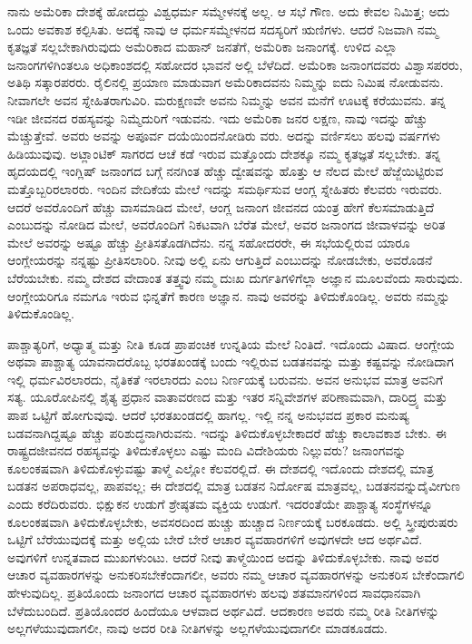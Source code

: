 ನಾನು ಅಮೆರಿಕಾ ದೇಶಕ್ಕೆ ಹೋದದ್ದು ವಿಶ್ವಧರ್ಮ ಸಮ್ಮೇಳನಕ್ಕೆ ಅಲ್ಲ. ಆ ಸಭೆ ಗೌಣ. ಅದು ಕೇವಲ ನಿಮಿತ್ತ; ಅದು ಒಂದು ಅವಕಾಶ ಕಲ್ಪಿಸಿತು. ಅದಕ್ಕೆ ನಾವು ಆ ಧರ್ಮಸಮ್ಮೇಳನದ ಸದಸ್ಯರಿಗೆ ಋಣಿಗಳು. ಆದರೆ ನಿಜವಾಗಿ ನಮ್ಮ ಕೃತಜ್ಞತೆ ಸಲ್ಲಬೇಕಾಗಿರುವುದು ಅಮೆರಿಕಾದ ಮಹಾನ್​ ಜನತೆಗೆ, ಅಮೆರಿಕಾ ಜನಾಂಗಕ್ಕೆ. ಉಳಿದ ಎಲ್ಲಾ ಜನಾಂಗಗಳಿಗಿಂತಲೂ ಅಧಿಕಾಂಶದಲ್ಲಿ ಸಹೋದರ ಭಾವನೆ ಅಲ್ಲಿ ಬೆಳೆದಿದೆ. ಅಮೆರಿಕಾ ಜನಾಂಗದವರು ವಿಶ್ವಾಸಪರರು, ಅತಿಥಿ ಸತ್ಕಾರಪರರು. ರೈಲಿನಲ್ಲಿ ಪ್ರಯಾಣ ಮಾಡುವಾಗ ಅಮೆರಿಕಾದವನು ನಿಮ್ಮನ್ನು ಐದು ನಿಮಿಷ ನೋಡುವನು. ನೀವಾಗಲೇ ಅವನ ಸ್ನೇಹಿತರಾಗುವಿರಿ. ಮರುಕ್ಷಣವೇ ಅವನು ನಿಮ್ಮನ್ನು ಅವನ ಮನೆಗೆ ಊಟಕ್ಕೆ ಕರೆಯುವನು. ತನ್ನ ಇಡೀ ಜೀವನದ ರಹಸ್ಯವನ್ನು ನಿಮ್ಮೆದುರಿಗೆ ಇಡುವನು. ಇದು ಅಮೆರಿಕಾ ಜನರ ಲಕ್ಷಣ, ನಾವು ಇದನ್ನು ಹೆಚ್ಚು ಮೆಚ್ಚುತ್ತೇವೆ. ಅವರು ಅವನ್ನು ಅಪೂರ್ವ ದಯೆಯಿಂದನೋಡಿರು ವರು. ಅದನ್ನು ವರ್ಣಿಸಲು ಹಲವು ವರ್ಷಗಳು ಹಿಡಿಯುವುವು. ಅಟ್ಲಾಂಟಿಕ್​ ಸಾಗರದ ಆಚೆ ಕಡೆ ಇರುವ ಮತ್ತೊಂದು ದೇಶಕ್ಕೂ ನಮ್ಮ ಕೃತಜ್ಞತೆ ಸಲ್ಲಬೇಕು. ತನ್ನ ಹೃದಯದಲ್ಲಿ ಇಂಗ್ಲಿಷ್​ ಜನಾಂಗದ ಬಗ್ಗೆ ನನಗಿಂತ ಹೆಚ್ಚು ದ್ವೇಷವನ್ನು ಹೊತ್ತು ಆ ನೆಲದ ಮೇಲೆ ಹೆಜ್ಜೆಯಿಟ್ಟಿರುವ ಮತ್ತೊಬ್ಬರಿರಲಾರರು. ಇಂದಿನ ವೇದಿಕೆಯ ಮೇಲೆ ಇದನ್ನು ಸಮರ್ಥಿಸುವ ಆಂಗ್ಲ ಸ್ನೇಹಿತರು ಕೆಲವರು ಇರುವರು. ಆದರೆ ಅವರೊಂದಿಗೆ ಹೆಚ್ಚು ವಾಸಮಾಡಿದ ಮೇಲೆ, ಆಂಗ್ಲ ಜನಾಂಗ ಜೀವನದ ಯಂತ್ರ ಹೇಗೆ ಕೆಲಸಮಾಡುತ್ತಿದೆ ಎಂಬುದನ್ನು ನೋಡಿದ ಮೇಲೆ, ಅವರೊಂದಿಗೆ ನಿಕಟವಾಗಿ ಬೆರೆತ ಮೇಲೆ, ಅವರ ಜನಾಂಗದ ಜೀವಾಳವನ್ನು ಅರಿತ ಮೇಲೆ ಅವರನ್ನು ಅಷ್ಟೂ ಹೆಚ್ಚು ಪ್ರೀತಿಸತೊಡಗಿದೆನು. ನನ್ನ ಸಹೋದರರೇ, ಈ ಸಭೆಯಲ್ಲಿರುವ ಯಾರೂ ಆಂಗ್ಲೇಯರನ್ನು ನನ್ನಷ್ಟು ಪ್ರೀತಿಸಲಾರಿರಿ. ನೀವು ಅಲ್ಲಿ ಏನು ಆಗುತ್ತಿದೆ ಎಂಬುದನ್ನು ನೋಡಬೇಕು, ಅವರೊಡನೆ ಬೆರೆಯಬೇಕು. ನಮ್ಮ ದೇಶದ ವೇದಾಂತ ತತ್ತ್ವವು ನಮ್ಮ ದುಃಖ ದುರ್ಗತಿಗಳಿಗೆಲ್ಲಾ ಅಜ್ಞಾನ ಮೂಲವೆಂದು ಸಾರುವುದು. ಆಂಗ್ಲೇಯರಿಗೂ ನಮಗೂ ಇರುವ ಭಿನ್ನತೆಗೆ ಕಾರಣ ಅಜ್ಞಾನ. ನಾವು ಅವರನ್ನು ತಿಳಿದುಕೊಂಡಿಲ್ಲ. ಅವರು ನಮ್ಮನ್ನು ತಿಳಿದುಕೊಂಡಿಲ್ಲ. 

ಪಾಶ್ಚಾತ್ಯರಿಗೆ, ಅಧ್ಯಾತ್ಮ ಮತ್ತು ನೀತಿ ಕೂಡ ಪ್ರಾಪಂಚಿಕ ಉನ್ನತಿಯ ಮೇಲೆ ನಿಂತಿದೆ. ಇದೊಂದು ವಿಷಾದ. ಆಂಗ್ಲೇಯ ಅಥವಾ ಪಾಶ್ಚಾತ್ಯ ಯಾವನಾದರೊಬ್ಬ ಭರತಖಂಡಕ್ಕೆ ಬಂದು ಇಲ್ಲಿರುವ ಬಡತನವನ್ನು ಮತ್ತು ಕಷ್ಟವನ್ನು ನೋಡಿದಾಗ ಇಲ್ಲಿ ಧರ್ಮವಿರಲಾರದು, ನೈತಿಕತೆ ಇರಲಾರದು ಎಂಬ ನಿರ್ಣಯಕ್ಕೆ ಬರುವನು. ಅವನ ಅನುಭವ ಮಾತ್ರ ಅವನಿಗೆ ಸತ್ಯ. ಯೂರೋಪಿನಲ್ಲಿ ಶೈತ್ಯ ಪ್ರಧಾನ ವಾತಾವರಣದ ಮತ್ತು ಇತರ ಸನ್ನಿವೇಶಗಳ ಪರಿಣಾಮವಾಗಿ, ದಾರಿದ್ರ್ಯ ಮತ್ತು ಪಾಪ ಒಟ್ಟಿಗೆ ಹೋಗುವುವು. ಆದರೆ ಭರತಖಂಡದಲ್ಲಿ ಹಾಗಲ್ಲ. ಇಲ್ಲಿ ನನ್ನ ಅನುಭವದ ಪ್ರಕಾರ ಮನುಷ್ಯ ಬಡವನಾಗಿದ್ದಷ್ಟೂ ಹೆಚ್ಚು ಪರಿಶುದ್ಧನಾಗಿರುವನು. ಇದನ್ನು ತಿಳಿದುಕೊಳ್ಳಬೇಕಾದರೆ ಹೆಚ್ಚು ಕಾಲಾವಕಾಶ ಬೇಕು. ಈ ರಾಷ್ಟ್ರದಜೀವನದ ರಹಸ್ಯವನ್ನು ತಿಳಿದುಕೊಳ್ಳಲು ಎಷ್ಟು ಮಂದಿ ವಿದೇಶಿಯರು ನಿಲ್ಲುವರು? ಜನಾಂಗವನ್ನು ಕೂಲಂಕಷವಾಗಿ ತಿಳಿದುಕೊಳ್ಳುವಷ್ಟು ತಾಳ್ಮೆ ಎಲ್ಲೋ ಕೆಲವರಲ್ಲಿದೆ. ಈ ದೇಶದಲ್ಲಿ ಇದೊಂದು ದೇಶದಲ್ಲಿ ಮಾತ್ರ ಬಡತನ ಅಪರಾಧವಲ್ಲ, ಪಾಪವಲ್ಲ; ಈ ದೇಶದಲ್ಲಿ ಮಾತ್ರ ಬಡತನ ನಿರ್ದೋಷ ಮಾತ್ರವಲ್ಲ, ಬಡತನವನ್ನುದೈವೀಗುಣ ಎಂದು ಕರೆದಿರುವರು. ಭಿಕ್ಷುಕನ ಉಡುಗೆ ಶ್ರೇಷ್ಠತಮ ವ್ಯಕ್ತಿಯ ಉಡುಗೆ. ಇದರಂತೆಯೇ ಪಾಶ್ಚಾತ್ಯ ಸಂಸ್ಥೆಗಳನ್ನೂ ಕೂಲಂಕಷವಾಗಿ ತಿಳಿದುಕೊಳ್ಳಬೇಕು, ಅವಸರದಿಂದ ಹುಚ್ಚು ಹುಚ್ಚಾದ ನಿರ್ಣಯಕ್ಕೆ ಬರಕೂಡದು. ಅಲ್ಲಿ ಸ್ತ್ರೀಪುರುಷರು ಒಟ್ಟಿಗೆ ಬೆರೆಯುವುದಕ್ಕೆ ಮತ್ತು ಅಲ್ಲಿಯ ಬೇರೆ ಬೇರೆ ಆಚಾರ ವ್ಯವಹಾರಗಳಿಗೆ ಅವುಗಳದೇ ಆದ ಅರ್ಥವಿದೆ. ಅವುಗಳಿಗೆ ಉನ್ನತವಾದ ಮುಖಗಳುಂಟು. ಆದರೆ ನೀವು ತಾಳ್ಮೆಯಿಂದ ಅದನ್ನು ತಿಳಿದುಕೊಳ್ಳಬೇಕು. ನಾವು ಅವರ ಆಚಾರ ವ್ಯವಹಾರಗಳನ್ನು ಅನುಕರಿಸಬೇಕೆಂದಾಗಲೀ, ಅವರು ನಮ್ಮ ಆಚಾರ ವ್ಯವಹಾರಗಳನ್ನು ಅನುಕರಿಸ ಬೇಕೆಂದಾಗಲಿ ಹೇಳುವುದಿಲ್ಲ. ಪ್ರತಿಯೊಂದು ಜನಾಂಗದ ಆಚಾರ ವ್ಯವಹಾರಗಳು ಹಲವು ಶತಮಾನಗಳಿಂದ ಸಾವಧಾನವಾಗಿ ಬೆಳೆದುಬಂದಿದೆ. ಪ್ರತಿಯೊಂದರ ಹಿಂದೆಯೂ ಆಳವಾದ ಅರ್ಥವಿದೆ. ಆದಕಾರಣ ಅವರು ನಮ್ಮ ರೀತಿ ನೀತಿಗಳನ್ನು ಅಲ್ಲಗಳೆಯುವುದಾಗಲೀ, ನಾವು ಅದರ ರೀತಿ ನೀತಿಗಳನ್ನು ಅಲ್ಲಗಳೆಯುವುದಾಗಲೀ ಮಾಡಕೂಡದು. 

